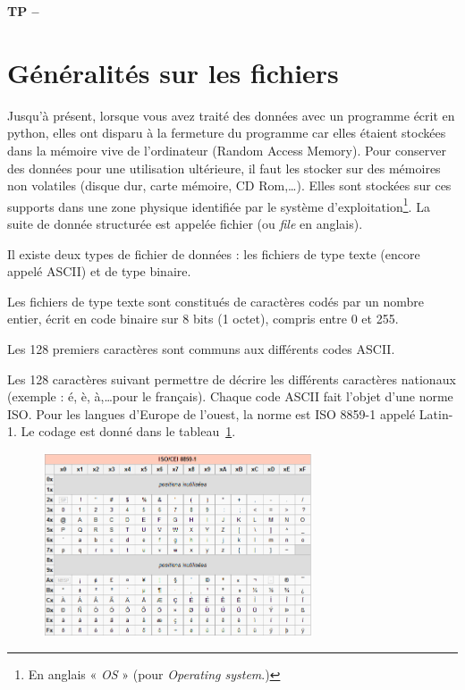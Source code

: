 

%



\begin{center}
{\Large\bf TP \no {\numero} -- \descrip}
\end{center}

\section*{Généralités sur les fichiers}

Jusqu’à présent, lorsque vous avez traité des données avec un programme écrit en python, elles ont disparu à la fermeture du programme car elles étaient stockées dans la mémoire vive de l’ordinateur (Random Access Memory). Pour conserver des données pour une utilisation ultérieure, il faut les stocker sur des mémoires non volatiles (disque dur, carte mémoire, CD Rom,\dots). Elles sont stockées sur ces supports dans une zone physique identifiée par le système d’exploitation\footnote{En anglais « \textit{OS} » (pour \textit{Operating system}.)}. La suite de donnée structurée est appelée fichier (ou \textit{file} en anglais).

Il existe deux types de fichier de données : les fichiers de type texte (encore appelé ASCII) et de type binaire.

Les fichiers de type texte sont constitués de caractères codés par un nombre entier, écrit en code binaire sur 8 bits (1 octet), compris entre 0 et 255.

Les 128 premiers caractères sont communs aux différents codes ASCII. 

Les 128 caractères suivant permettre de décrire les différents caractères nationaux (exemple : é, è, à,\dots pour le français). Chaque code ASCII fait l’objet d’une norme ISO. Pour les langues d’Europe de l’ouest, la norme est ISO 8859-1 appelé Latin-1. Le codage est donné dans le tableau~\ref{fig:tableASCII}.

\begin{figure}[htp]
 \centering
 \includegraphics[width=8cm]{tableASCII}
 \label{fig:tableASCII}
\end{figure}

